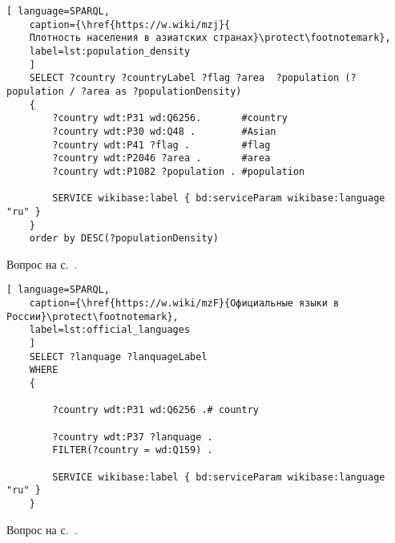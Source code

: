 \begin{task}
	\label{answer:population_density}
	
	\begin{lstlisting}[ language=SPARQL, 
	caption={\href{https://w.wiki/mzj}{
	Плотность населения в азиатских странах}\protect\footnotemark},
	label=lst:population_density
	]
	SELECT ?country ?countryLabel ?flag ?area  ?population (?population / ?area as ?populationDensity)
	{
		?country wdt:P31 wd:Q6256.       #country
		?country wdt:P30 wd:Q48 .        #Asian
		?country wdt:P41 ?flag .         #flag
		?country wdt:P2046 ?area .       #area
		?country wdt:P1082 ?population . #population
		
		SERVICE wikibase:label { bd:serviceParam wikibase:language "ru" }
	}
	order by DESC(?populationDensity)
	\end{lstlisting}
	
	\small{Вопрос на с.~\pageref{lst:without_inception}.}
\end{task}

\begin{task}
	\label{answer:official_language}
	
	\begin{lstlisting}[ language=SPARQL, 
	caption={\href{https://w.wiki/mzF}{Официальные языки в России}\protect\footnotemark},
	label=lst:official_languages
	]
	SELECT ?lanquage ?lanquageLabel
	WHERE
	{
	
		?country wdt:P31 wd:Q6256 .# country
		
		?country wdt:P37 ?lanquage .
		FILTER(?country = wd:Q159) . 
		
		SERVICE wikibase:label { bd:serviceParam wikibase:language "ru" }
	}
	\end{lstlisting}
	
	\small{Вопрос на с.~\pageref{lst:without_inception}.}
\end{task}


